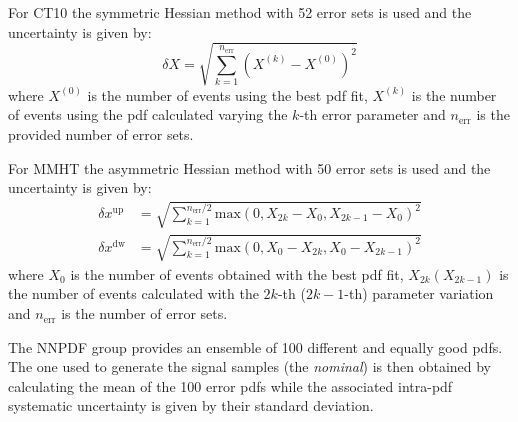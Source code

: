 For CT10 the symmetric Hessian method with 52 error sets is used and the
uncertainty is given by:
\begin{equation}
  \label{eq:119}
  \delta X = \sqrt{\sum_{k = 1}^{n_\mathrm{err}} \left(X^{(k)} -
      X^{(0)} \right)^2}
\end{equation}
where $X^{(0)}$ is the number of events using the best \gls{pdf} fit, $X^{(k)}$
is the number of events using the \gls{pdf} calculated varying the $k$-th error
parameter and $n_\mathrm{err}$ is the provided number of error sets.

For MMHT the asymmetric Hessian method with 50 error sets is used and the
uncertainty is given by:
\begin{align}
  \label{eq:120}
  \delta x^{\mathrm{up}} & = \sqrt{\sum_{k = 1}^{n_\mathrm{err}/2}
                           \mathrm{max}(0, X_{2k} - X_0, X_{2k - 1} - X_0)^2} \\
  \delta x^{\mathrm{dw}} & = \sqrt{\sum_{k = 1}^{n_\mathrm{err}/2}
                           \mathrm{max}(0, X_0 - X_{2k}, X_0 - X_{2k - 1})^2}
\end{align}
where $X_0$ is the number of events obtained with the best \gls{pdf} fit,
$X_{2k} (X_{2k -1})$ is the number of events calculated with the $2k$-th
($2k -1$-th) parameter variation and $n_\mathrm{err}$ is the number of error
sets.

The NNPDF group provides an ensemble of 100 different and equally good
\glspl{pdf}. The one used to generate the signal samples (the \emph{nominal}) is
then obtained by calculating the mean of the 100 error \glspl{pdf} while the
associated intra-\gls{pdf} systematic uncertainty is given by their standard
deviation.

